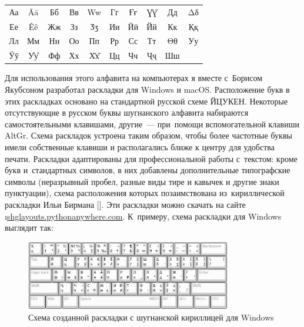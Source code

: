 \begin{table}[H]
 \centering
 \label{tab:ortho_alphabet}
 \begin{tabular}{cccccccccc}
 Аа & Āā & Бб & Вв & Ww & Гг & Ғғ & Ɣ̌ɣ̌ & Дд & Δδ \\
 Ее & Êê & Жж & Зз & Ӡӡ & Ии & Ӣӣ & Йй & Кк & Ққ \\
 Лл & Мм & Нн & Оо & Пп & Рр & Сс & Тт & Θθ & Уу \\
 Ӯӯ & У̊у̊ & Фф & Хх & Х̌х̌ & Цц & Чч & Ҷҷ & Шш & ~ \\
 \end{tabular}
\end{table}

Для использования этого алфавита на компьютерах я вместе с~Борисом Якубсоном разработал раскладки для Windows и macOS. Расположение букв в этих раскладках основано на стандартной русской схеме ЙЦУКЕН. Некоторые отсутствующие в русском буквы шугнанского алфавита набираются самостоятельными клавишами, другие~— при~помощи вспомогательной клавиши AltGr. Схема раскладок устроена таким образом, чтобы более частотные буквы имели собственные клавиши и располагались ближе к центру для удобства печати. Раскладки адаптированы для профессиональной работы с~текстом: кроме букв и~стандартных символов, в них добавлены дополнительные типографские символы (неразрывный пробел, разные виды тире и кавычек и другие знаки пунктуации), схема расположения которых позаимствована из~кириллической раскладки Ильи Бирмана [\cite*{birman}]. Эти раскладки можно скачать на сайте \i{\href{https://shglayouts.pythonanywhere.com}{shglayouts.pythonanywhere.com}}. К~примеру, схема раскладки для Windows выглядит так:

\begin{figure}[H]
 \centering
 \caption{Схема созданной раскладки с шугнанской кириллицей для Windows}
 \smallskip
 \label{fig:ortho4}
 \includegraphics[width=0.8\textwidth]{img/ortho4.jpg}
\end{figure}

